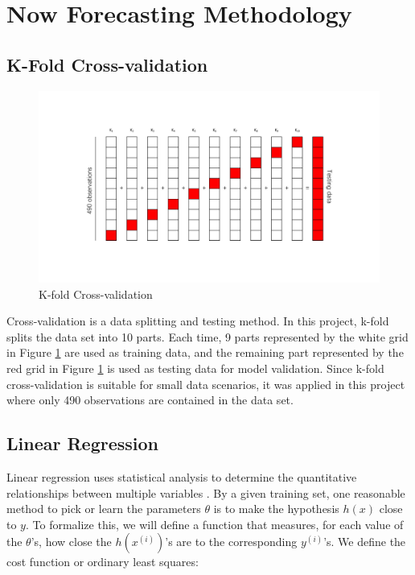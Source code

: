 \section{Now Forecasting Methodology} %

\subsection{K-Fold Cross-validation}
\begin{figure}[htbp]
    \center
    \includegraphics[scale=0.4]{Figure/3.5.1-K-Fold.pdf}
    \caption{K-fold Cross-validation}
    \label{3.5.1-K-Fold}
\end{figure}

Cross-validation is a data splitting and testing method. In this project, k-fold splits the data set into 10 parts. Each time, 9 parts represented by the white grid in Figure \ref{3.5.1-K-Fold} are used as training data, and the remaining part represented by the red grid in Figure \ref{3.5.1-K-Fold} is used as testing data for model validation. Since k-fold cross-validation is suitable for small data scenarios, it was applied in this project where only 490 observations are contained in the data set.


\subsection{Linear Regression}
Linear regression uses statistical analysis to determine the quantitative relationships between multiple variables \cite{montgomery2012introduction}. By a given training set, one reasonable method to pick or learn the parameters $\theta$ is to make the hypothesis $h(x)$ close to $y$. To formalize this, we will define a function that measures, for each value of the $\theta$'s, how close the $h (x^{(i)})$'s are to the corresponding $y^{(i)}$'s. We define the cost function or ordinary least squares:


